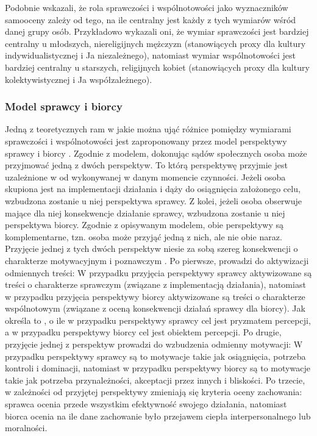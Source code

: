 \documentclass[man]{apa6}
\begin{document}
Podobnie \textcite{gebauer2013agency} wskazali, że rola sprawczości i wspólnotowości jako wyznaczników samooceny zależy od tego, na ile centralny jest każdy z tych wymiarów wśród danej grupy osób. Przykładowo wykazali oni, że wymiar sprawczości jest bardziej centralny u młodszych, niereligijnych mężczyzn (stanowiących proxy dla kultury indywidualistycznej i Ja niezależnego), natomiast wymiar wspólnotowości jest bardziej centralny u starszych, religijnych kobiet (stanowiących proxy dla kultury kolektywistycznej i Ja współzależnego).\\

\subsubsection{Model sprawcy i biorcy \parencite{wojciszke2006perspektywa}}

Jedną z teoretycznych ram w jakie można ująć różnice pomiędzy wymiarami sprawczości i wspólnotowości jest zaproponowany przez \textcite{wojciszke2006perspektywa} model perspektywy sprawcy i biorcy \parencite[w ostatnich opracowaniach określany również jako model perspektywy aktora i obserwatora,][]{abele2014communal}. Zgodnie z modelem, dokonując sądów społecznych osoba może przyjmować jedną z dwóch perspektyw. To którą perspektywę przyjmie jest uzależnione w od wykonywanej w danym momencie czynności. Jeżeli osoba skupiona jest na implementacji działania i dąży do osiągnięcia założonego celu, wzbudzona zostanie u niej perspektywa sprawcy. Z kolei, jeżeli osoba obserwuje mające dla niej konsekwencje działanie sprawcy, wzbudzona zostanie u niej perspektywa biorcy. Zgodnie z opisywanym modelem, obie perspektywy są komplementarne, tzn. osoba może przyjąć jedną z nich, ale nie obie naraz.\\

Przyjęcie jednej z tych dwóch perspektyw niesie za sobą szereg konsekwencji o charakterze motywacyjnym i poznawczym \parencite[patrz,][]{wojciszke2010sprawczosc}. Po pierwsze, prowadzi do aktywizacji odmiennych treści: W przypadku przyjęcia perspektywy sprawcy aktywizowane są treści o charakterze sprawczym (związane z implementacją działania), natomiast w przypadku przyjęcia perspektywy biorcy aktywizowane są treści o charakterze wspólnotowym (związane z oceną konsekwencji działań sprawcy dla biorcy). Jak określa to \textcite{wojciszke2010sprawczosc}, o ile w przypadku perspektywy sprawcy cel jest pryzmatem percepcji, a w przypadku perspektywy biorcy cel jest obiektem percepcji. Po drugie, przyjęcie jednej z perspektyw prowadzi do wzbudzenia odmienny motywacji: W przypadku perspektywy sprawcy są to motywacje takie jak osiągnięcia, potrzeba kontroli i dominacji, natomiast w przypadku perspektywy biorcy są to motywacje takie jak potrzeba przynależności, akceptacji przez innych i bliskości. Po trzecie, w zależności od przyjętej perspektywy zmieniają się kryteria oceny zachowania: sprawca ocenia przede wszystkim efektywność swojego działania, natomiast biorca ocenia na ile dane zachowanie było przejawem ciepła interpersonalnego lub moralności.\\
\end{document}

